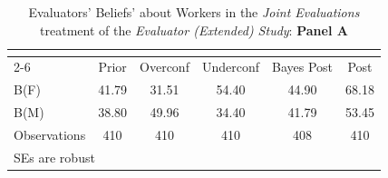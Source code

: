 \begin{table}[htbp]\centering
\caption{Evaluators' Beliefs' about Workers in the \textit{Joint Evaluations} treatment of the \textit{Evaluator (Extended) Study}: \textbf{Panel A}}
\begin{tabular}{l*{5}{c}}
\hline\hline
                &\multicolumn{5}{c}{}                             \\\cmidrule(lr){2-6}
                &\multicolumn{1}{c}{Prior}&\multicolumn{1}{c}{Overconf}&\multicolumn{1}{c}{Underconf}&\multicolumn{1}{c}{Bayes Post}&\multicolumn{1}{c}{Post}\\
\hline
B(F)            &    41.79&    31.51&    54.40&    44.90&    68.18\\
B(M)            &    38.80&    49.96&    34.40&    41.79&    53.45\\
\hline
Observations    &      410&      410&      410&      408&      410\\
\hline\hline
\multicolumn{6}{l}{\footnotesize SEs are robust}\\
\end{tabular}
\end{table}
